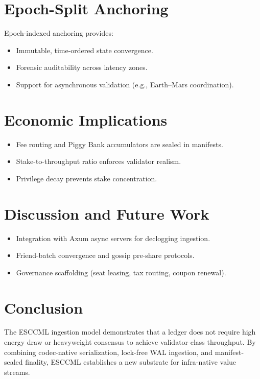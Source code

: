 \documentclass[11pt, a4paper]{article}
\begin{document}
\section{Epoch-Split Anchoring}
Epoch-indexed anchoring provides:
\begin{itemize}
    \item Immutable, time-ordered state convergence.
    \item Forensic auditability across latency zones.
    \item Support for asynchronous validation (e.g., Earth–Mars coordination).
\end{itemize}

\section{Economic Implications}
\begin{itemize}
    \item Fee routing and Piggy Bank accumulators are sealed in manifests.
    \item Stake-to-throughput ratio enforces validator realism.
    \item Privilege decay prevents stake concentration.
\end{itemize}

\section{Discussion and Future Work}
\begin{itemize}
    \item Integration with Axum async servers for declogging ingestion.
    \item Friend-batch convergence and gossip pre-share protocols.
    \item Governance scaffolding (seat leasing, tax routing, coupon renewal).
\end{itemize}

\section{Conclusion}
The ESCCML ingestion model demonstrates that a ledger does not require high energy draw
or heavyweight consensus to achieve validator-class throughput. By combining codec-native
serialization, lock-free WAL ingestion, and manifest-sealed finality, ESCCML establishes a
new substrate for infra-native value streams.
\end{document}
